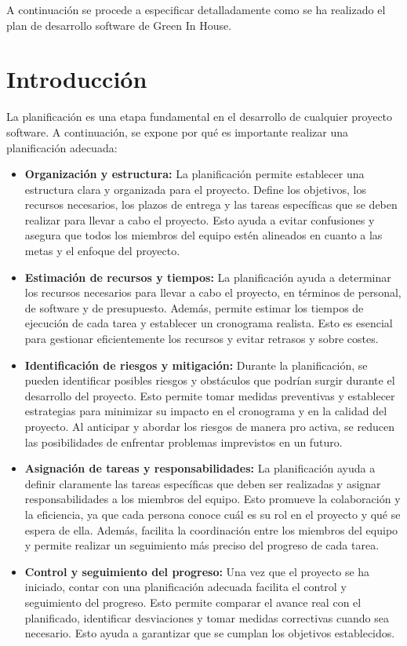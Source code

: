 A continuación se procede a especificar detalladamente como se ha realizado el plan de desarrollo software de Green In House.
\section{Introducción}
La planificación es una etapa fundamental en el desarrollo de cualquier proyecto software. A continuación, se expone por qué es importante realizar una planificación adecuada:
\begin{itemize}
    \item \textbf{Organización y estructura:} La planificación permite establecer una estructura clara y organizada para el proyecto. Define los objetivos, los recursos necesarios, los plazos de entrega y las tareas específicas que se deben realizar para llevar a cabo el proyecto. Esto ayuda a evitar confusiones y asegura que todos los miembros del equipo estén alineados en cuanto a las metas y el enfoque del proyecto.
    \item \textbf{Estimación de recursos y tiempos:} La planificación ayuda a determinar los recursos necesarios para llevar a cabo el proyecto, en términos de personal, de software y de presupuesto. Además, permite estimar los tiempos de ejecución de cada tarea y establecer un cronograma realista. Esto es esencial para gestionar eficientemente los recursos y evitar retrasos y sobre costes.  
    \item \textbf{Identificación de riesgos y mitigación:} Durante la planificación, se pueden identificar posibles riesgos y obstáculos que podrían surgir durante el desarrollo del proyecto. Esto permite tomar medidas preventivas y establecer estrategias para minimizar su impacto en el cronograma y en la calidad del proyecto. Al anticipar y abordar los riesgos de manera pro activa, se reducen las posibilidades de enfrentar problemas imprevistos en un futuro.  
    \item \textbf{Asignación de tareas y responsabilidades:} La planificación ayuda a definir claramente las tareas específicas que deben ser realizadas y asignar responsabilidades a los miembros del equipo. Esto promueve la colaboración y la eficiencia, ya que cada persona conoce cuál es su rol en el proyecto y qué se espera de ella. Además, facilita la coordinación entre los miembros del equipo y permite realizar un seguimiento más preciso del progreso de cada tarea.
    \item \textbf{Control y seguimiento del progreso:} Una vez que el proyecto se ha iniciado, contar con una planificación adecuada facilita el control y seguimiento del progreso. Esto permite comparar el avance real con el planificado, identificar desviaciones y tomar medidas correctivas cuando sea necesario. Esto ayuda a garantizar que se cumplan los objetivos establecidos.
\end{itemize}

